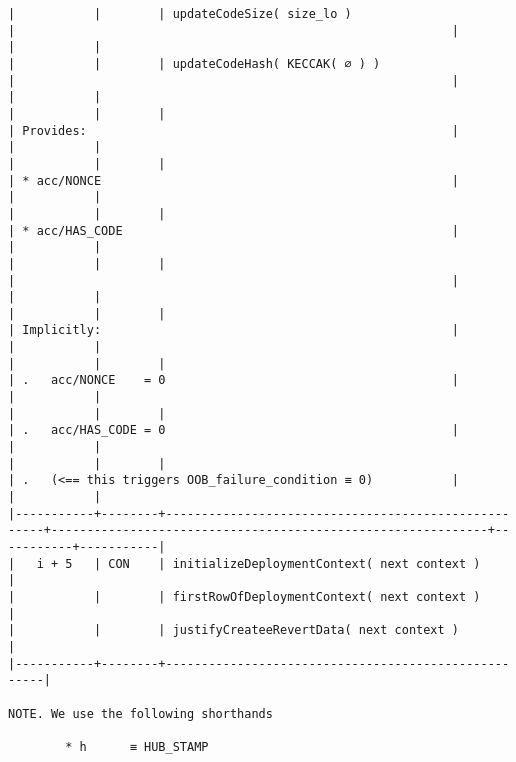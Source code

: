 \documentclass[varwidth=\maxdimen,margin=0.5cm,multi={verbatim}]{standalone}
\begin{document}
\begin{verbatim}
|           |        | updateCodeSize( size_lo )                           |                                                             |           |           |
|           |        | updateCodeHash( KECCAK( ∅ ) )                       |                                                             |           |           |
|           |        |                                                     | Provides:                                                   |           |           |
|           |        |                                                     | * acc/NONCE                                                 |           |           |
|           |        |                                                     | * acc/HAS_CODE                                              |           |           |
|           |        |                                                     |                                                             |           |           |
|           |        |                                                     | Implicitly:                                                 |           |           |
|           |        |                                                     | .   acc/NONCE    = 0                                        |           |           |
|           |        |                                                     | .   acc/HAS_CODE = 0                                        |           |           |
|           |        |                                                     | .   (<== this triggers OOB_failure_condition ≡ 0)           |           |           |
|-----------+--------+-----------------------------------------------------+-------------------------------------------------------------+-----------+-----------|
|   i + 5   | CON    | initializeDeploymentContext( next context )         |
|           |        | firstRowOfDeploymentContext( next context )         |
|           |        | justifyCreateeRevertData( next context )            |
|-----------+--------+-----------------------------------------------------|

NOTE. We use the following shorthands

        * h      ≡ HUB_STAMP

\end{verbatim}
\end{document}
